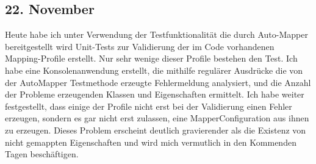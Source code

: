 \subsection{22. November}
Heute habe ich unter Verwendung der Testfunktionalität die durch Auto-Mapper bereitgestellt wird Unit-Tests zur Validierung der im Code vorhandenen Mapping-Profile erstellt. Nur sehr wenige dieser Profile bestehen den Test. Ich habe eine Konsolenanwendung erstellt, die mithilfe regulärer Ausdrücke die von der AutoMapper Testmethode erzeugte Fehlermeldung analysiert, und die Anzahl der Probleme erzeugenden Klassen und Eigenschaften ermittelt. Ich habe weiter festgestellt, dass einige der Profile nicht erst bei der Validierung einen Fehler erzeugen, sondern es gar nicht erst zulassen, eine MapperConfiguration aus ihnen zu erzeugen. Dieses Problem erscheint deutlich gravierender als die Existenz von nicht gemappten Eigenschaften und wird mich vermutlich in den Kommenden Tagen beschäftigen.